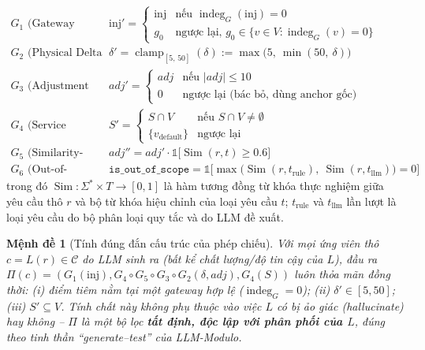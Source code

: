 \documentclass[11pt,a4paper]{article}
\newtheorem{proposition}{Mệnh đề}
\begin{document}
\begin{align}
G_1 \text{ (Gateway Invariance):} \quad & \text{inj}'  = \begin{cases} \text{inj} & \text{nếu } \operatorname{indeg}_G(\text{inj}) = 0 \\ g_0 & \text{ngược lại, } g_0 \in \{v \in V : \operatorname{indeg}_G(v)=0\} \end{cases} \\
G_2 \text{ (Physical Delta Bound):} \quad & \delta' = \operatorname{clamp}_{[5,\,50]}(\delta) := \max\big(5,\ \min(50,\ \delta)\big) \\
G_3 \text{ (Adjustment Clamp):} \quad & adj' = \begin{cases} adj & \text{nếu } |adj| \leq 10 \\ 0 & \text{ngược lại (bác bỏ, dùng anchor gốc)} \end{cases} \\
G_4 \text{ (Service Existence):} \quad & S' = \begin{cases} S \cap V & \text{nếu } S \cap V \neq \emptyset \\ \{v_{\text{default}}\} & \text{ngược lại} \end{cases} \\
G_5 \text{ (Similarity-Gated):} \quad & adj'' = adj' \cdot \mathbb{1}\big[\operatorname{Sim}(r, t) \geq 0.6\big] \\
G_6 \text{ (Out-of-Taxonomy Refusal):} \quad & \texttt{is\_out\_of\_scope} = \mathbb{1}\Big[\max\big(\operatorname{Sim}(r, t_{\text{rule}}),\ \operatorname{Sim}(r, t_{\text{llm}})\big) = 0\Big]
\end{align}
trong đó $\operatorname{Sim} : \Sigma^* \times T \to [0,1]$ là hàm tương đồng từ khóa thực nghiệm giữa yêu cầu thô $r$ và bộ từ khóa hiệu chỉnh của loại yêu cầu $t$; $t_{\text{rule}}$ và $t_{\text{llm}}$ lần lượt là loại yêu cầu do bộ phân loại quy tắc và do LLM đề xuất.

\begin{proposition}[Tính đúng đắn cấu trúc của phép chiếu]
Với mọi ứng viên thô $c = L(r) \in \mathcal{C}$ do LLM sinh ra (bất kể chất lượng/độ tin cậy của $L$), đầu ra $\Pi(c) = (G_1(\text{inj}), G_4 \circ G_5 \circ G_3 \circ G_2(\delta, adj), G_4(S))$ luôn thỏa mãn đồng thời: (i) điểm tiêm nằm tại một gateway hợp lệ ($\operatorname{indeg}_G = 0$); (ii) $\delta' \in [5, 50]$; (iii) $S' \subseteq V$. Tính chất này không phụ thuộc vào việc $L$ có bị ảo giác (hallucinate) hay không -- $\Pi$ là một bộ lọc \textbf{tất định, độc lập với phân phối của $L$}, đúng theo tinh thần ``generate--test'' của LLM-Modulo.
\end{proposition}
\end{document}
